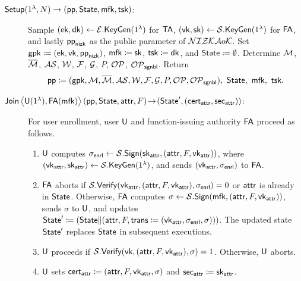 \begin{description}

\item[$\SMSSetup(1^\lambda, N) \to (\pp, \State, \mfk, \tsk)$:]
Sample $(\ek, \dk) \gets \EKeyGen(1^\lambda)$ for $\TA$,
$(\vk, \sk) \gets \SKeyGen(1^\lambda)$ for $\FA$,
and lastly 
$\ppnizk$ as the public parameter of $\NIZKAoK$.
Set $\gpk \coloneqq (\ek, \vk, \ppnizk)$, $\mfk \coloneqq \sk$, $\tsk \coloneqq \dk$, and $\State \coloneqq \emptyset$.
Determine $\MessageSpace$, $\TMessageSpace$, $\AttrSpace$, $\WitnessSpace$,
$\FFamily$, $\GFamily$, $P$, $\OpeningSet$, $\OpeningSetSignable$.
Return
\[
\pp \coloneqq (\gpk, \MessageSpace, \TMessageSpace, \AttrSpace,
\WitnessSpace, \FFamily, \GFamily, P, \OpeningSet, \OpeningSetSignable),\
\State,\
\mfk,\
\tsk.
\]

\item[$\SMSJoin\interaction{\User(1^\lambda)}{\FA(\mfk)}(\pp, \State, \attr, F)
\!\to\! (\State', (\certattr, \secattr))$:]
For user enrollment,
user $\User$ 
and 
function-issuing authority $\FA$
proceed as follows.

\begin{enumerate}
\item 
$\User$ computes $\sigmaenroll \gets \SSign(\skattr, (\attr, F, \vkattr))$,
where $(\vkattr, \skattr) \gets \SKeyGen(1^\lambda)$,
and sends $(\vkattr, \sigmaenroll)$ to $\FA$.
\item
$\FA$ aborts if $\SVerify(\vkattr, (\attr, F, \vkattr), \sigmaenroll) = 0$
or $\attr$ is already in $\State$.
Otherwise, $\FA$ computes $\sigma \gets \SSign(\mfk, (\attr, F, \vkattr))$,
sends $\sigma$ to $\User$,
and updates
$\State' \coloneqq (\State \| (\attr, F, \transcript \coloneqq (\vkattr, \sigmaenroll, \sigma)))$.
The updated state $\State'$ replaces $\State$ in subsequent executions.
\item
$\User$ proceeds if $\SVerify(\vk, (\attr, F, \vkattr), \sigma) = 1$.
Otherwise, $\User$ aborts.
\item 
$\User$ sets
$\certattr \coloneqq (\attr, F, \vkattr, \sigma)$ and $\secattr \coloneqq \skattr$.
\end{enumerate}


\end{description}

